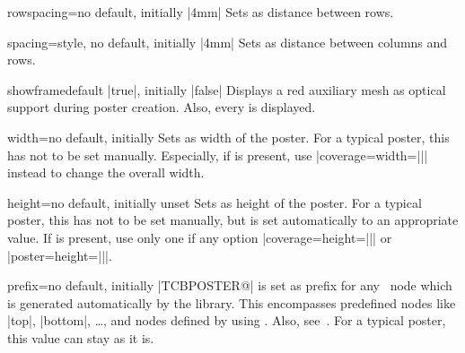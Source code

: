 \begin{posterTcbKey}[][doc new=2017-07-03]{rowspacing}{=}{no default, initially |4mm|}
  Sets  as distance between rows.
\end{posterTcbKey}

\begin{posterTcbKey}[][doc new=2017-07-03]{spacing}{=}{style, no default, initially |4mm|}
  Sets  as distance between columns and rows.
\end{posterTcbKey}


\begin{posterTcbKey}[][doc new=2017-07-03]{showframe}{}{default |true|, initially |false|}
  Displays a red auxiliary mesh as optical support during poster creation.
  Also, every  is displayed.
\end{posterTcbKey}


\begin{posterTcbKey}[][doc new=2017-07-03]{width}{=}{no default, initially }
  Sets  as width of the poster. For a typical poster, this has not
  to be set manually. Especially, if  is present,
  use |coverage={width=||}| instead to change the overall width.
\end{posterTcbKey}

\enlargethispage*{1cm}

\begin{posterTcbKey}[][doc new=2017-07-03]{height}{=}{no default, initially unset}
  Sets  as height of the poster. For a typical poster, this has not
  to be set manually, but is set automatically to an appropriate value.
  If  is present, use only one if any option
  |coverage={height=||}| or |poster={height=||}|.
\end{posterTcbKey}


\begin{posterTcbKey}[][doc new=2017-07-03]{prefix}{=}{no default, initially |TCBPOSTER@|}
   is set as prefix for any \tikzname\ node which is generated
  automatically by the  library. This encompasses predefined
  nodes like |top|, |bottom|, \ldots, and nodes defined by using
  . Also, see~.
  For a typical poster, this value can stay as it is.
\end{posterTcbKey}


